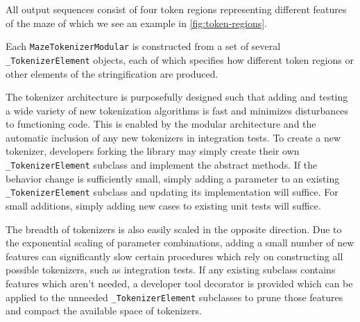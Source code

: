 \documentclass[10pt,a4paper,onecolumn]{article}
\let\origfigure\figure
\let\endorigfigure\endfigure
\renewenvironment{figure}[1][2] {
    \expandafter\origfigure\expandafter[H]
} {
    \endorigfigure
}
\begin{document}
All output sequences consist of four token regions representing
different features of the maze of which we see an example in
\autoref{fig:token-regions}.

\begin{figure} 
  \centering
  \begin{minipage}{5in}
    \footnotesize
    
  \end{minipage}
  \caption{
    Example text output format with token regions highlighted.
    \colorbox[RGB]{ 217,210,233 }{Adjacency list}: text representation of the lattice graph,
    \colorbox[RGB]{ 217,234,211 }{Origin}: starting coordinate,
    \colorbox[RGB]{ 234,209,220 }{Target}: ending coordinate,
    \colorbox[RGB]{ 207,226,243 }{Path}: maze solution sequence
  }
  \label{fig:token-regions}
\end{figure}

Each \texttt{MazeTokenizerModular} is constructed from a set of several
\texttt{\_TokenizerElement} objects, each of which specifies how
different token regions or other elements of the stringification are
produced.

\begin{figure}
    \centering
    
    \caption{Nested internal structure of \texttt{\_TokenizerElement} objects inside a typical \texttt{MazeTokenizerModular}.}
\end{figure}

The tokenizer architecture is purposefully designed such that adding and
testing a wide variety of new tokenization algorithms is fast and
minimizes disturbances to functioning code. This is enabled by the
modular architecture and the automatic inclusion of any new tokenizers
in integration tests. To create a new tokenizer, developers forking the
library may simply create their own \texttt{\_TokenizerElement} subclass
and implement the abstract methods. If the behavior change is
sufficiently small, simply adding a parameter to an existing
\texttt{\_TokenizerElement} subclass and updating its implementation
will suffice. For small additions, simply adding new cases to existing
unit tests will suffice.

The breadth of tokenizers is also easily scaled in the opposite
direction. Due to the exponential scaling of parameter combinations,
adding a small number of new features can significantly slow certain
procedures which rely on constructing all possible tokenizers, such as
integration tests. If any existing subclass contains features which
aren't needed, a developer tool decorator is provided which can be
applied to the unneeded \texttt{\_TokenizerElement} subclasses to prune
those features and compact the available space of tokenizers.
\end{document}

